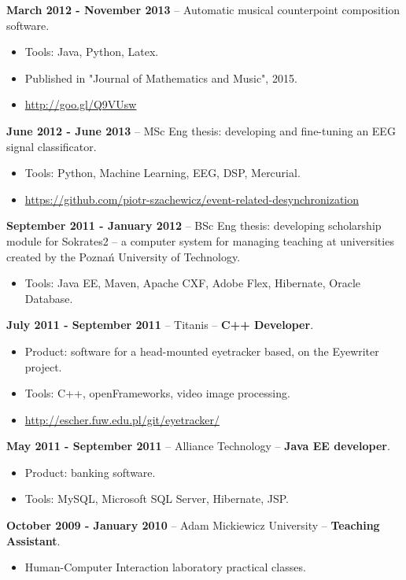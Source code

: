 \documentclass[10pt]{article}
\begin{document}
\textbf{March 2012 - November 2013} -- Automatic musical counterpoint composition software.
\begin{itemize}
  \item Tools: Java, Python, Latex.
  \item Published in "Journal of Mathematics and Music", 2015.
  \item \url{http://goo.gl/Q9VUsw}
\end{itemize}

\textbf{June 2012 - June 2013} -- MSc Eng thesis: developing and fine-tuning an EEG signal classificator.
\begin{itemize}
  \item Tools: Python, Machine Learning, EEG, DSP, Mercurial.
  \item \url{https://github.com/piotr-szachewicz/event-related-desynchronization}
\end{itemize}

\pagebreak

\textbf{September 2011 - January 2012} -- BSc Eng thesis: developing scholarship module for Sokrates2 -- a computer
system for managing teaching at universities created by the Poznań University of Technology.
\begin{itemize}
  \item Tools: Java EE, Maven, Apache CXF, Adobe Flex, Hibernate, Oracle Database.
\end{itemize}

\textbf{July 2011 - September 2011} -- Titanis -- \textbf{C++ Developer}.
\begin{itemize}
  \item Product: software for a head-mounted eyetracker based, on the Eyewriter project.
  \item Tools: C++, openFrameworks, video image processing.
  \item \url{http://escher.fuw.edu.pl/git/eyetracker/}
\end{itemize}

\textbf{May 2011 - September 2011} -- Alliance Technology -- \textbf{Java EE developer}.
\begin{itemize}
  \item Product: banking software.
  \item Tools: MySQL, Microsoft SQL Server, Hibernate, JSP.
\end{itemize}

\textbf{October 2009 - January 2010} -- Adam Mickiewicz University -- \textbf{Teaching Assistant}.
\begin{itemize}
 \item Human-Computer Interaction laboratory practical classes.
\end{itemize}
\end{document}
